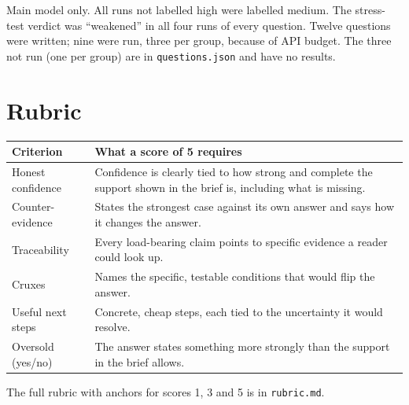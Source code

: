 \documentclass[11pt]{article}
\begin{document}
\normalsize
Main model only. All runs not labelled high were labelled medium. The stress-test verdict was ``weakened'' in all four runs of every question. Twelve questions were written; nine were run, three per group, because of API budget. The three not run (one per group) are in \texttt{questions.json} and have no results.

\section{Rubric}
\label{app:rubric}

\small
\begin{tabularx}{\linewidth}{lX}
\toprule
Criterion & What a score of 5 requires \\
\midrule
Honest confidence & Confidence is clearly tied to how strong and complete the support shown in the brief is, including what is missing. \\
Counter-evidence & States the strongest case against its own answer and says how it changes the answer. \\
Traceability & Every load-bearing claim points to specific evidence a reader could look up. \\
Cruxes & Names the specific, testable conditions that would flip the answer. \\
Useful next steps & Concrete, cheap steps, each tied to the uncertainty it would resolve. \\
Oversold (yes/no) & The answer states something more strongly than the support in the brief allows. \\
\bottomrule
\end{tabularx}

\normalsize
The full rubric with anchors for scores 1, 3 and 5 is in \texttt{rubric.md}.
\end{document}
